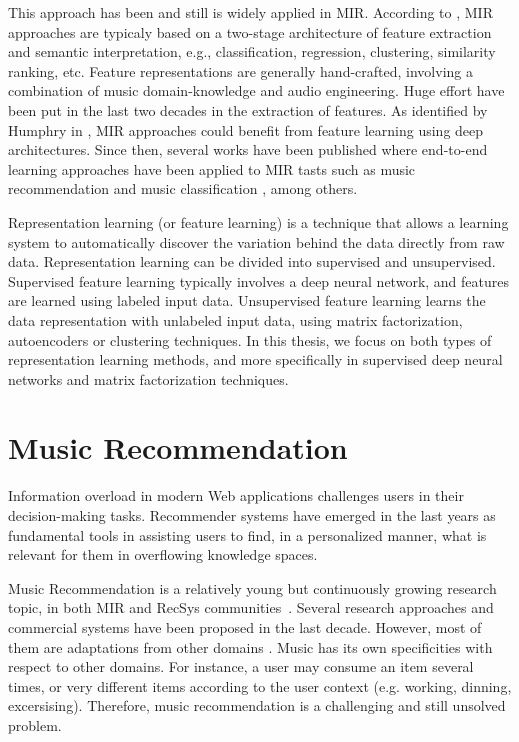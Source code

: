 This approach has been and still is widely applied in MIR. According to \cite{Humphry}, MIR approaches are typicaly based on a two-stage architecture of feature extraction and semantic interpretation, e.g., classification, regression, clustering, similarity ranking, etc. Feature representations are generally hand-crafted, involving a combination of music domain-knowledge and audio engineering. Huge effort have been put in the last two decades in the extraction of features. As identified by Humphry in \cite{Humphry}, MIR approaches could benefit from feature learning using deep architectures. Since then, several works have been published where end-to-end learning approaches have been applied to MIR tasts such as music recommendation \cite{} and music classification \cite{}, among others.

Representation learning (or feature learning) is a technique that allows a learning system to automatically discover the variation behind the data directly from raw data. Representation learning can be divided into supervised and unsupervised. Supervised feature learning typically involves a deep neural network, and features are learned using labeled input data. Unsupervised feature learning learns the data representation with unlabeled input data, using matrix factorization, autoencoders or clustering techniques. In this thesis, we focus on both types of representation learning methods, and more specifically in supervised deep neural networks and matrix factorization techniques.


\section{Music Recommendation}

Information overload in modern Web applications challenges users in their decision-making tasks. Recommender systems have emerged in the last years as fundamental tools in assisting users to find, in a personalized manner, what is relevant for them in overflowing knowledge spaces. 

Music Recommendation is a relatively young but continuously growing research topic, in both MIR and RecSys communities~\cite{oscarBook}. Several research approaches and commercial systems have been proposed in the last decade. However, most of them are adaptations from other domains \cite{oscarBook}. Music has its own specificities with respect to other domains. For instance, a user may consume an item several times, or very different items according to the user context (e.g. working, dinning, excersising). Therefore, music recommendation is a challenging and still unsolved problem.

